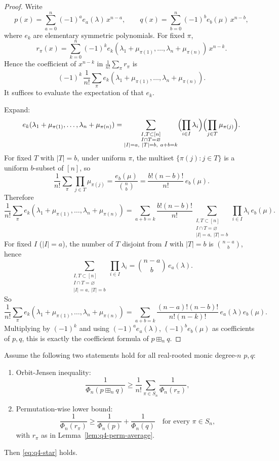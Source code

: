 \begin{proof}
Write
\[
p(x)=\sum_{a=0}^n (-1)^a e_a(\lambda)\,x^{n-a},
\qquad
q(x)=\sum_{b=0}^n (-1)^b e_b(\mu)\,x^{n-b},
\]
where $e_k$ are elementary symmetric polynomials.
For fixed $\pi$,
\[
r_\pi(x)=\sum_{k=0}^n (-1)^k e_k(\lambda_1+\mu_{\pi(1)},\dots,\lambda_n+\mu_{\pi(n)})\,x^{n-k}.
\]
Hence the coefficient of $x^{n-k}$ in $\frac1{n!}\sum_\pi r_\pi$ is
\[
(-1)^k\,\frac1{n!}\sum_{\pi} e_k(\lambda_1+\mu_{\pi(1)},\dots,\lambda_n+\mu_{\pi(n)}).
\]
It suffices to evaluate the expectation of that $e_k$.

Expand:
\[
e_k(\lambda_1+\mu_{\pi(1)},\dots,\lambda_n+\mu_{\pi(n)})
=
\sum_{\substack{I,T\subset[n]\\ I\cap T=\varnothing\\ |I|=a,\ |T|=b,\ a+b=k}}
\Bigl(\prod_{i\in I}\lambda_i\Bigr)\Bigl(\prod_{j\in T}\mu_{\pi(j)}\Bigr).
\]
For fixed $T$ with $|T|=b$, under uniform $\pi$, the multiset
$\{\pi(j):j\in T\}$ is a uniform $b$-subset of $[n]$, so
\[
\frac1{n!}\sum_{\pi}\prod_{j\in T}\mu_{\pi(j)}
=
\frac{e_b(\mu)}{\binom{n}{b}}
=
\frac{b!(n-b)!}{n!}\,e_b(\mu).
\]
Therefore
\[
\frac1{n!}\sum_{\pi} e_k(\lambda_1+\mu_{\pi(1)},\dots,\lambda_n+\mu_{\pi(n)})
=
\sum_{a+b=k}
\frac{b!(n-b)!}{n!}
\!\!\!\sum_{\substack{I,T\subset[n]\\ I\cap T=\varnothing\\ |I|=a,\ |T|=b}}
\prod_{i\in I}\lambda_i\, e_b(\mu).
\]
For fixed $I$ ($|I|=a$), the number of $T$ disjoint from $I$ with $|T|=b$ is
$\binom{n-a}{b}$, hence
\[
\sum_{\substack{I,T\subset[n]\\ I\cap T=\varnothing\\ |I|=a,\ |T|=b}}
\prod_{i\in I}\lambda_i
=
\binom{n-a}{b}\,e_a(\lambda).
\]
So
\[
\frac1{n!}\sum_{\pi} e_k(\lambda_1+\mu_{\pi(1)},\dots,\lambda_n+\mu_{\pi(n)})
=
\sum_{a+b=k}
\frac{(n-a)!(n-b)!}{n!(n-k)!}\,e_a(\lambda)e_b(\mu).
\]
Multiplying by $(-1)^k$ and using
$(-1)^a e_a(\lambda)$, $(-1)^b e_b(\mu)$ as coefficients of $p,q$,
this is exactly the coefficient formula of $p\boxplus_n q$.
\end{proof}

\begin{proposition}\label{prop:q4-orbit-jensen-reduction}
Assume the following two statements hold for all real-rooted monic
degree-$n$ $p,q$:
\begin{enumerate}[nosep]
\item Orbit-Jensen inequality:
\[
\frac1{\Phi_n(p\boxplus_n q)}
\ge
\frac1{n!}\sum_{\pi\in S_n}\frac1{\Phi_n(r_\pi)},
\]
\item Permutation-wise lower bound:
\[
\frac1{\Phi_n(r_\pi)}
\ge
\frac1{\Phi_n(p)}+\frac1{\Phi_n(q)}
\quad\text{for every }\pi\in S_n,
\]
with $r_\pi$ as in Lemma~\ref{lem:q4-perm-average}.
\end{enumerate}
Then \eqref{eq:q4-star} holds.
\end{proposition}

